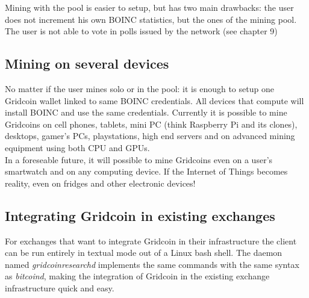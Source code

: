 Mining with the pool is easier to setup, but has two main drawbacks: the user does not increment his own BOINC statistics, but the ones of the  mining pool. The user is not able to vote in polls issued by the network (see chapter 9)

\subsection{Mining on several devices}

No matter if the user mines solo or in the pool: it is enough to setup one Gridcoin wallet linked to same BOINC credentials. All devices that compute will install BOINC and use the same credentials. Currently it is possible to mine Gridcoins on cell phones, tablets, mini PC (think Raspberry Pi and its clones), desktops, gamer's PCs, playstations, high end servers and on advanced mining equipment using both CPU and GPUs.\\

In a foreseable future, it will possible to mine Gridcoins even on a user's smartwatch and on any computing device. If the Internet of Things becomes reality, even on fridges and other electronic devices!

\subsection{Integrating Gridcoin in existing exchanges}

For exchanges that want to integrate Gridcoin in their infrastructure the client can be run entirely in textual mode out of a Linux bash shell. The daemon named \textit{gridcoinresearchd} implements the same commands with the same syntax as \textit{bitcoind}, making the integration of Gridcoin in the existing exchange infrastructure quick and easy.\\
